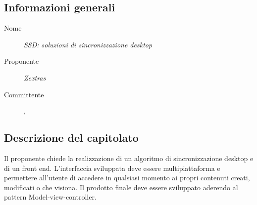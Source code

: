 
  \subsection{Informazioni generali}
  \begin{description}
    \item[Nome] \textit{SSD: soluzioni di sincronizzazione desktop}
    \item[Proponente] \textit{Zextras}
    \item[Committente] \VT{}, \CR{}
  \end{description}

  \subsection{Descrizione del capitolato}
Il proponente chiede la realizzazione di un algoritmo di sincronizzazione desktop e di un front end. L'interfaccia sviluppata deve essere multipiattaforma e permettere all'utente di accedere in qualsiasi momento ai propri contenuti creati, modificati o che visiona. Il prodotto finale deve essere sviluppato aderendo al pattern Model-view-controller.

